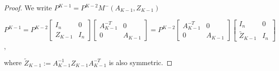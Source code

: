 \documentclass[10pt]{amsart}
\theoremstyle{remark}
\begin{document}
\begin{proof}
We write $P^{K-1} = P^{K-2} M^-(A_{K-1}, Z_{K-1})$
\begin{center} \label{P^K-1}
    $P^{K-1} = P^{K-2} \left[\begin{array}{ccc} I_n & 0 \\ Z_{K-1} & I_n\end{array}\right] \left[\begin{array}{ccc} A^{-T}_{K-1} & 0 \\ 0 & A_{K-1}\end{array}\right] = P^{K-2} \left[\begin{array}{ccc} A^{-T}_{K-1} & 0 \\ 0 & A_{K-1}\end{array}\right] \left[\begin{array}{ccc} I_n & 0 \\ \tilde{Z}_{K-1} & I_n\end{array}\right]$,
\end{center}
where $\tilde{Z}_{K-1}:= A_{K-1}^{-1} Z_{K-1} A_{K-1}^{-T}$ is also symmetric. 



\end{proof}
\end{document}
